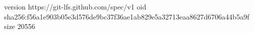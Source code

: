 version https://git-lfs.github.com/spec/v1
oid sha256:f56a1e903b05e3d576de9bc37f36ae1ab829e5a32713eaa8627d6706a44b5a9f
size 20556
